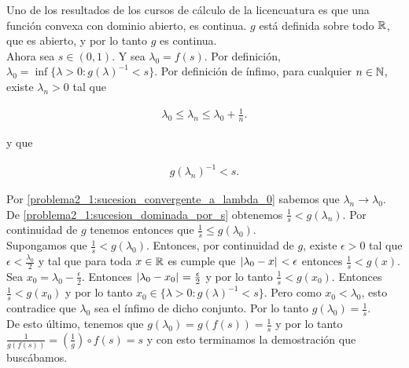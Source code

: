     Uno de los resultados de los cursos de cálculo de la licencuatura es que una función convexa con dominio abierto, es continua.
    $g$ está definida sobre todo $\mathbb{R}$, que es abierto, y por lo tanto $g$ es continua.\\
    
    Ahora sea $s \in (0,1)$. Y sea $\lambda_0 = f(s)$. Por definición, $\lambda_0 = \inf\{ \lambda > 0 : g(\lambda)^{-1} < s\}$. Por definición de ínfimo,
    para cualquier $n \in \mathbb{N}$, existe $\lambda_n > 0$ tal que 
    
    \begin{align}
        \lambda_0 \leq \lambda_n \leq \lambda_0 + \frac{1}{n}. \label{problema2_1:sucesion_convergente_a_lambda_0}
    \end{align}
     
    y que
    
    \begin{align}
        g(\lambda_n)^{-1} < s. \label{problema2_1:sucesion_dominada_por_s}
    \end{align}
    
    Por \eqref{problema2_1:sucesion_convergente_a_lambda_0} sabemos que $\lambda_n \rightarrow \lambda_0$.
    De \eqref{problema2_1:sucesion_dominada_por_s} obtenemos $\frac{1}{s} < g(\lambda_n)$. Por continuidad de $g$
    tenemos entonces que $\frac{1}{s} \leq g(\lambda_0)$.\\
    
    Supongamos que $\frac{1}{s} < g(\lambda_0)$. Entonces, por continuidad de $g$, existe $\epsilon > 0$ tal que
    $\epsilon < \frac{\lambda_0}{2}$ y tal que para toda $x \in \mathbb{R}$ es cumple que $\hspace{.25mm}\left|\lambda_0 - x\right|\hspace{.25mm} < \epsilon$ 
    entonces $\frac{1}{s} < g(x)$.\\
    
    Sea $x_0 = \lambda_0 - \frac{\epsilon}{2}$. Entonces $\hspace{.25mm}\left|\lambda_0 - x_0\right|\hspace{.25mm} = \frac{\epsilon}{2}$ y por lo tanto
    $\frac{1}{s}<g(x_0)$. Entonces $\frac{1}{s} < g(x_0)$ y por lo tanto $x_0 \in \{ \lambda > 0 : g(\lambda)^{-1} < s \}$.
    Pero como $x_0 < \lambda_0$, esto contradice que $\lambda_0$ sea el ínfimo de dicho conjunto. Por lo tanto
    $g(\lambda_0) = \frac{1}{s}$.\\
    
    De esto último, tenemos que $g(\lambda_0) = g(f(s)) = \frac{1}{s}$ y por lo tanto \\
    $\frac{1}{g(f(s))} = (\frac{1}{g}) \circ f (s) = s$ y con esto terminamos la demostración que buscábamos. \par\null
    
